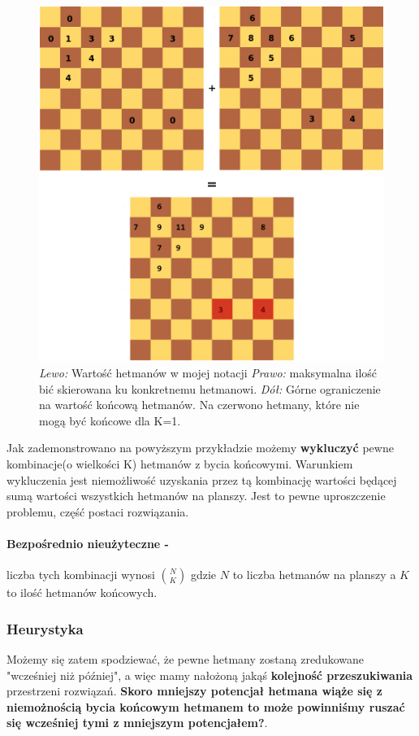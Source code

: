 \documentclass{article}
\begin{document}
\begin{figure}[!ht]
  \centering
      \includegraphics[scale=0.25]{obs1a.png}
  \caption{\textit{Lewo:} Wartość hetmanów w mojej notacji \textit{Prawo:} maksymalna ilość bić skierowana ku konkretnemu hetmanowi.\textit{ Dół:} Górne ograniczenie na wartość końcową hetmanów. Na czerwono hetmany, które nie mogą być końcowe dla K=1.}
  
\end{figure}

Jak zademonstrowano na powyższym przykładzie możemy \textbf{wykluczyć} pewne kombinacje(o wielkości K) hetmanów z bycia końcowymi. Warunkiem wykluczenia jest niemożliwość uzyskania przez tą kombinację wartości będącej sumą wartości wszystkich hetmanów na planszy. Jest to pewne uproszczenie problemu, część postaci rozwiązania.

\paragraph{Bezpośrednio nieużyteczne -}liczba tych kombinacji wynosi $\binom{N} {K}$ gdzie $N$ to liczba hetmanów na planszy a $K$ to ilość hetmanów końcowych.

\subsubsection{Heurystyka}

Możemy się zatem spodziewać, że pewne hetmany zostaną zredukowane "wcześniej niż później", a więc mamy nałożoną jakąś \textbf{kolejność przeszukiwania} przestrzeni rozwiązań. \textbf{Skoro mniejszy potencjał hetmana wiąże się z niemożnością bycia końcowym hetmanem to może powinniśmy ruszać się  wcześniej tymi z mniejszym potencjałem?}.
\end{document}
